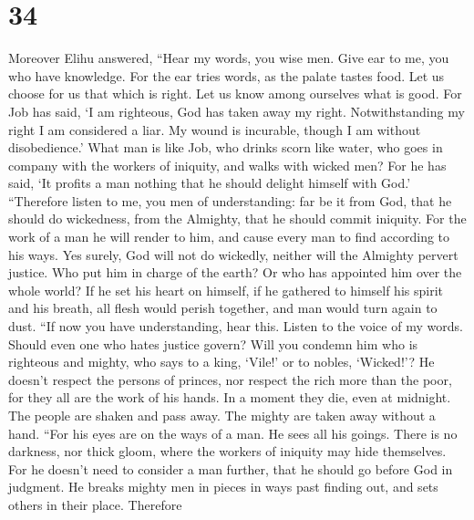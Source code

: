\hypertarget{section-33}{%
\section{34}\label{section-33}}

 Moreover Elihu answered,  ``Hear my words,
you wise men. Give ear to me, you who have knowledge.  For
the ear tries words, as the palate tastes food.  Let us
choose for us that which is right. Let us know among ourselves what is
good.  For Job has said, `I am righteous, God has taken
away my right.  Notwithstanding my right I am considered a
liar. My wound is incurable, though I am without disobedience.'
 What man is like Job, who drinks scorn like water,
 who goes in company with the workers of iniquity, and
walks with wicked men?  For he has said, `It profits a man
nothing that he should delight himself with God.' 
``Therefore listen to me, you men of understanding: far be it from God,
that he should do wickedness, from the Almighty, that he should commit
iniquity.  For the work of a man he will render to him,
and cause every man to find according to his ways.  Yes
surely, God will not do wickedly, neither will the Almighty pervert
justice.  Who put him in charge of the earth? Or who has
appointed him over the whole world?  If he set his heart
on himself, if he gathered to himself his spirit and his breath,
 all flesh would perish together, and man would turn
again to dust.  ``If now you have understanding, hear
this. Listen to the voice of my words.  Should even one
who hates justice govern? Will you condemn him who is righteous and
mighty,  who says to a king, `Vile!' or to nobles,
`Wicked!'?  He doesn't respect the persons of princes,
nor respect the rich more than the poor, for they all are the work of
his hands.  In a moment they die, even at midnight. The
people are shaken and pass away. The mighty are taken away without a
hand.  ``For his eyes are on the ways of a man. He sees
all his goings.  There is no darkness, nor thick gloom,
where the workers of iniquity may hide themselves.  For
he doesn't need to consider a man further, that he should go before God
in judgment.  He breaks mighty men in pieces in ways past
finding out, and sets others in their place.  Therefore
